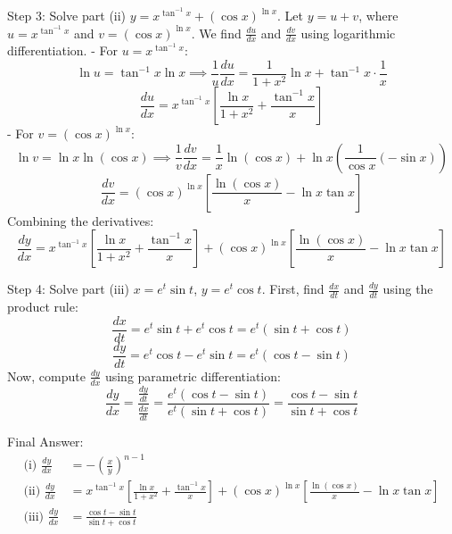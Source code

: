 \documentclass{article}
\begin{document}
Step 3: Solve part (ii) $y = x^{\tan^{-1} x} + (\cos x)^{\ln x}$.
Let $y = u + v$, where $u = x^{\tan^{-1} x}$ and $v = (\cos x)^{\ln x}$. We find $\frac{du}{dx}$ and $\frac{dv}{dx}$ using logarithmic differentiation.
- For $u = x^{\tan^{-1} x}$:
  \[
  \ln u = \tan^{-1} x \ln x \implies \frac{1}{u} \frac{du}{dx} = \frac{1}{1+x^2} \ln x + \tan^{-1} x \cdot \frac{1}{x}
  \]
  \[
  \frac{du}{dx} = x^{\tan^{-1} x} \left[ \frac{\ln x}{1+x^2} + \frac{\tan^{-1} x}{x} \right]
  \]
- For $v = (\cos x)^{\ln x}$:
  \[
  \ln v = \ln x \ln(\cos x) \implies \frac{1}{v} \frac{dv}{dx} = \frac{1}{x} \ln(\cos x) + \ln x \left( \frac{1}{\cos x} (-\sin x) \right)
  \]
  \[
  \frac{dv}{dx} = (\cos x)^{\ln x} \left[ \frac{\ln(\cos x)}{x} - \ln x \tan x \right]
  \]
Combining the derivatives:
\[
\frac{dy}{dx} = x^{\tan^{-1} x} \left[ \frac{\ln x}{1+x^2} + \frac{\tan^{-1} x}{x} \right] + (\cos x)^{\ln x} \left[ \frac{\ln(\cos x)}{x} - \ln x \tan x \right]
\]

Step 4: Solve part (iii) $x = e^t \sin t$, $y = e^t \cos t$.
First, find $\frac{dx}{dt}$ and $\frac{dy}{dt}$ using the product rule:
\[
\frac{dx}{dt} = e^t \sin t + e^t \cos t = e^t(\sin t + \cos t)
\]
\[
\frac{dy}{dt} = e^t \cos t - e^t \sin t = e^t(\cos t - \sin t)
\]
Now, compute $\frac{dy}{dx}$ using parametric differentiation:
\[
\frac{dy}{dx} = \frac{\frac{dy}{dt}}{\frac{dx}{dt}} = \frac{e^t(\cos t - \sin t)}{e^t(\sin t + \cos t)} = \frac{\cos t - \sin t}{\sin t + \cos t}
\]

Final Answer:
\begin{align*}
    \text{(i) } \frac{dy}{dx} &= -\left(\frac{x}{y}\right)^{n-1} \\
    \text{(ii) } \frac{dy}{dx} &= x^{\tan^{-1} x} \left[ \frac{\ln x}{1+x^2} + \frac{\tan^{-1} x}{x} \right] + (\cos x)^{\ln x} \left[ \frac{\ln(\cos x)}{x} - \ln x \tan x \right] \\
    \text{(iii) } \frac{dy}{dx} &= \frac{\cos t - \sin t}{\sin t + \cos t}
\end{align*}

\end{document}
